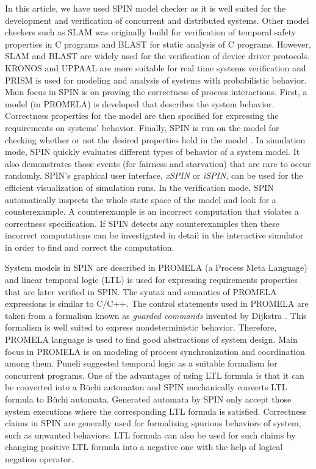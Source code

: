 \documentclass[conference]{IEEEtran}
\begin{document}
In this article, we have used SPIN \cite{7} model checker as it is well suited for the development and verification of concurrent and distributed 
systems. Other model checkers such as SLAM \cite{10} was originally build for verification of temporal safety properties in C programs
and BLAST \cite{4} for static analysis of C programs. However, SLAM and BLAST are widely used for the verification of device driver protocols.
KRONOS \cite{11} and UPPAAL \cite{12} are more suitable for real time systems verification and PRISM \cite{15} is used for modeling and analysis of 
systems with probabilistic behavior. Main focus in SPIN is on proving the correctness of process interactions. First, a model (in PROMELA) 
is developed that describes the system behavior. Correctness properties for the model are then specified for expressing the requirements on systems’ 
behavior. Finally, SPIN is run on the model for checking whether or not the desired properties hold in the model \cite{17}. In simulation mode, 
SPIN quickly evaluates different types of behavior of a system model. It also demonstrates those events (for fairness and starvation) that are 
rare to occur randomly. SPIN's graphical user interface, \textit{xSPIN} or \textit{iSPIN}, can be used for the efficient visualization of 
simulation runs. In the verification mode, SPIN automatically inspects the whole state space of the model and look for a counterexample. 
A counterexample is an incorrect computation that violates a correctness specification. If SPIN detects any counterexamples then these incorrect 
computations can be investigated in detail in the interactive simulator in order to find and correct the computation. 

System models in SPIN are described in PROMELA (a Process Meta Language) \cite{17} and linear temporal logic (LTL) is used for expressing 
requirements properties that are later verified in SPIN. The syntax and semantics of PROMELA expressions is similar to C/C++. The control statements
used in PROMELA are taken from a formalism known as \textit{guarded commands} invented by Dijkstra \cite{23}. This formalism is well suited to 
express nondeterministic behavior. Therefore, PROMELA language is used to find good abstractions of system design. Main focus in PROMELA is on 
modeling of process synchronization and coordination among them. Puneli \cite{16} suggested temporal logic as a suitable formalism for concurrent 
programs. One of the advantages of using LTL formula is that it can be converted into a B\"{u}chi automaton \cite{24} and SPIN mechanically converts
LTL formula to B\"{u}chi automata. Generated automata by SPIN only accept those system executions where the corresponding LTL formula is 
satisfied. Correctness claims in SPIN are generally used for formalizing spurious behaviors of system, such as unwanted behaviors. 
LTL formula can also be used for such claims by changing positive LTL formula into a negative one with the help of logical negation operator.
\end{document}
